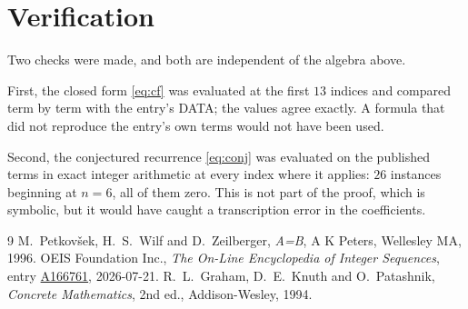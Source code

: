 \documentclass[11pt,a4paper]{article}
\theoremstyle{plain}
\theoremstyle{definition}
\begin{document}
\section{Verification}

Two checks were made, and both are independent of the algebra above.

First, the closed form \eqref{eq:cf} was evaluated at the first $13$ indices and
compared term by term with the entry's DATA; the values agree exactly. A formula that did
not reproduce the entry's own terms would not have been used.

Second, the conjectured recurrence \eqref{eq:conj} was evaluated on the published terms in
exact integer arithmetic at every index where it applies: $26$ instances beginning at
$n=6$, all of them zero. This is not part of the proof, which is symbolic, but it
would have caught a transcription error in the coefficients.

\begin{thebibliography}{9}
 M.~Petkov\v{s}ek, H.~S.~Wilf and D.~Zeilberger, \emph{A=B}, A K Peters,
Wellesley MA, 1996.
 OEIS Foundation Inc., \emph{The On-Line Encyclopedia of Integer Sequences},
entry \href{https://oeis.org/A166761}{A166761}, 2026-07-21.
 R.~L.~Graham, D.~E.~Knuth and O.~Patashnik, \emph{Concrete Mathematics},
2nd ed., Addison-Wesley, 1994.
\end{thebibliography}
\end{document}
